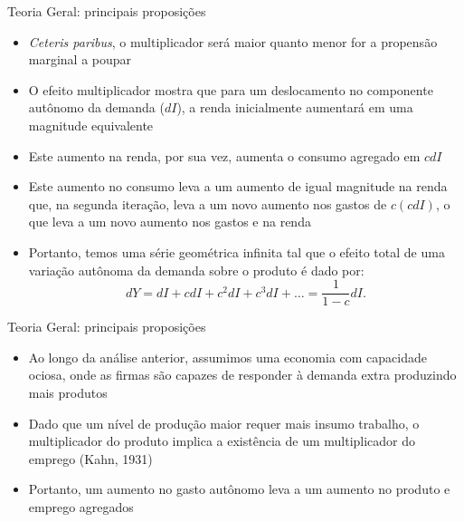 \documentclass[10pt]{beamer}
\begin{document}
\begin{frame}{Teoria Geral: principais proposições}
    \begin{itemize}
        \item \emph{Ceteris paribus}, o multiplicador será maior quanto menor for a propensão marginal a poupar
        \bigskip
        \item O efeito multiplicador mostra que para um deslocamento no componente autônomo da demanda ($dI$), a renda inicialmente aumentará em uma magnitude equivalente
        \bigskip
        \item Este aumento na renda, por sua vez, aumenta o consumo agregado em $cdI$
        \bigskip
        \item Este aumento no consumo leva a um aumento de igual magnitude na renda que, na segunda iteração, leva a um novo aumento nos gastos de $c(cdI)$, o que leva a um novo aumento nos gastos e na renda
        \bigskip
        \item Portanto, temos uma série geométrica infinita tal que o efeito total de uma variação autônoma da demanda sobre o produto é dado por:
        \begin{equation}
            dY = dI + cdI + c^2dI + c^3 dI + \dots = \frac{1}{1 - c} dI.
            \label{eq6}
        \end{equation}
    \end{itemize}
\end{frame}

\begin{frame}{Teoria Geral: principais proposições}
    \begin{itemize}
        \item Ao longo da análise anterior, assumimos uma economia com capacidade ociosa, onde as firmas são capazes de responder à demanda extra produzindo mais produtos
        \bigskip
        \item Dado que um nível de produção maior requer mais insumo trabalho, o multiplicador do produto implica a existência de um multiplicador do emprego (Kahn, 1931)
        \bigskip
        \item Portanto, um aumento no gasto autônomo leva a um aumento no produto e emprego agregados
    \end{itemize}
\end{frame}
\end{document}

